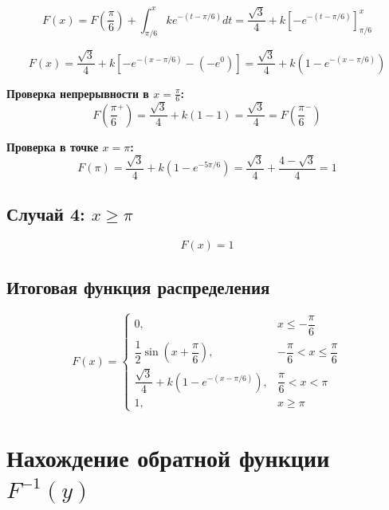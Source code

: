 \documentclass[12pt,a4paper]{article}
\begin{document}
\begin{equation}
F(x) = F\left(\frac{\pi}{6}\right) + \int_{\pi/6}^{x} ke^{-(t-\pi/6)}dt = \frac{\sqrt{3}}{4} + k\left[-e^{-(t-\pi/6)}\right]_{\pi/6}^{x}
\end{equation}

\begin{equation}
F(x) = \frac{\sqrt{3}}{4} + k\left[-e^{-(x-\pi/6)} - (-e^{0})\right] = \frac{\sqrt{3}}{4} + k\left(1 - e^{-(x-\pi/6)}\right)
\end{equation}

\textbf{Проверка непрерывности в $x = \frac{\pi}{6}$:}
\begin{equation}
F\left(\frac{\pi}{6}^+\right) = \frac{\sqrt{3}}{4} + k(1-1) = \frac{\sqrt{3}}{4} = F\left(\frac{\pi}{6}^-\right)
\end{equation}

\textbf{Проверка в точке $x = \pi$:}
\begin{equation}
F(\pi) = \frac{\sqrt{3}}{4} + k\left(1 - e^{-5\pi/6}\right) = \frac{\sqrt{3}}{4} + \frac{4-\sqrt{3}}{4} = 1
\end{equation}

\subsection*{Случай 4: $x \geq \pi$}

\begin{equation}
F(x) = 1
\end{equation}

\subsection*{Итоговая функция распределения}

\begin{equation}
F(x) = \begin{cases} 
0, & x \leq -\dfrac{\pi}{6} \\[12pt]
\dfrac{1}{2}\sin\left(x+\dfrac{\pi}{6}\right), & -\dfrac{\pi}{6} < x \leq \dfrac{\pi}{6} \\[15pt]
\dfrac{\sqrt{3}}{4} + k\left(1-e^{-(x-\pi/6)}\right), & \dfrac{\pi}{6} < x < \pi \\[15pt]
1, & x \geq \pi
\end{cases}
\end{equation}

\section{Нахождение обратной функции $F^{-1}(y)$}
\end{document}
